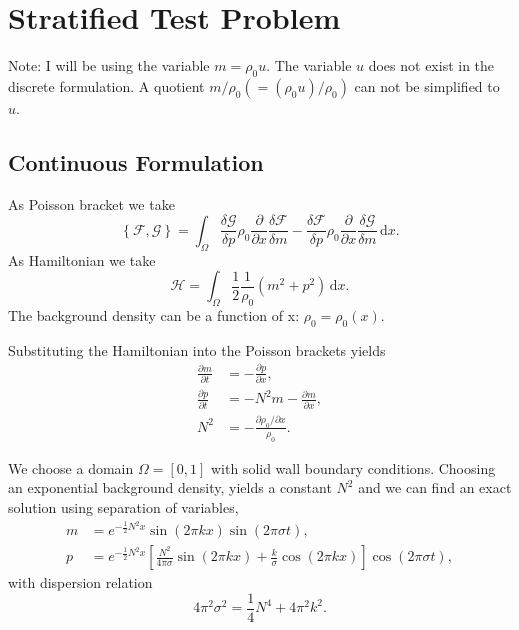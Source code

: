 \documentclass{article}
\begin{document}
\section{Stratified Test Problem}
Note: I will be using the variable $m=\rho_0 u$. The variable $u$ does not exist in the discrete formulation. A quotient $m / \rho_0 (= (\rho_0 u)/\rho_0 )$ can not be simplified to $u$.
\subsection{Continuous Formulation}
As Poisson bracket we take 
\begin{equation}
	\label{sntc:eq:contPoiBra}
\left\{\mathcal{F}, \mathcal{G}\right\} = \int_\Omega \! \frac{\delta \mathcal{G}}{\delta p} \rho_0 \frac{\partial}{\partial x} \frac{\delta \mathcal{F}}{\delta m} - \frac{\delta \mathcal{F}}{\delta p} \rho_0 \frac{\partial}{\partial x} \frac{\delta \mathcal{G}}{\delta m} \, \mathrm{d}x.
\end{equation}
As Hamiltonian we take
\begin{equation}
	\mathcal{H} = \int_\Omega \! \frac{1}{2} \frac{1}{\rho_0} \left( m^2 + p^2 \right) \, \mathrm{d}x.
\end{equation}
The background density can be a function of x: $\rho_0=\rho_0(x)$.

Substituting the Hamiltonian into the Poisson brackets yields 
\begin{equation}
	\begin{aligned}
		\frac{\partial m}{\partial t} &= -\frac{\partial p}{\partial x}, \\
		\frac{\partial p}{\partial t} &= - N^2 m - \frac{\partial m}{\partial x}, \\ 
		N^2 &= -\frac{\partial \rho_0/\partial x}{\rho_0}.
	\end{aligned}
\end{equation}

We choose a domain $\Omega = [0,1]$ with solid wall boundary conditions. Choosing an exponential background density, yields a constant $N^2$ and we can find an exact solution using separation of variables,
\begin{equation}
	\begin{aligned}
		m &= e^{-\frac{1}{2} N^2 x} \sin(2 \pi k x) \sin(2 \pi \sigma t), \\
		p &= e^{-\frac{1}{2} N^2 x} \left[\frac{N^2}{4\pi\sigma} \sin(2 \pi k x) + \frac{k}{\sigma} \cos(2 \pi k x)\right] \cos(2 \pi \sigma t),
	\end{aligned}
\end{equation}
with dispersion relation
\begin{equation}
	4 \pi^2 \sigma^2 = \frac{1}{4} N^4 + 4 \pi^2 k^2.
\end{equation}
\end{document}
